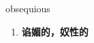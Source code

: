 
\begin{frame}
{\huge obsequious}
\begin{center}
\begin{enumerate}\Large
  \item \textbf{谄媚的，奴性的}
\end{enumerate}
\end{center}
\end{frame}
